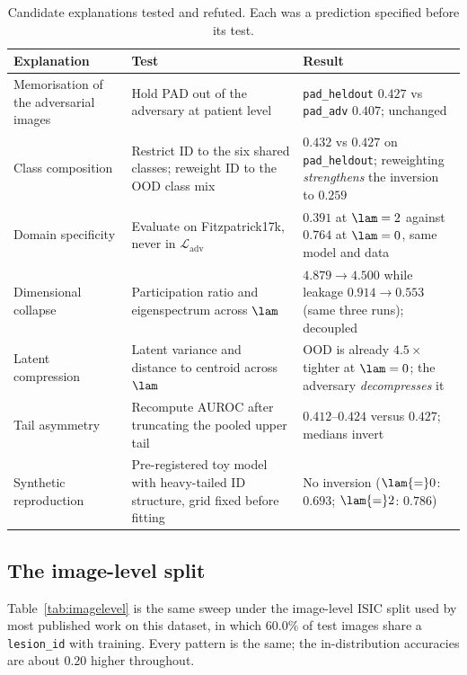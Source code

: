 \begin{table}[t]
\centering
\small
\caption{Candidate explanations tested and refuted. Each was a prediction specified
before its test.}
\label{tab:refuted}
\begin{tabular}{p{3.1cm}p{5.2cm}p{6.1cm}}
\toprule
Explanation & Test & Result \\
\midrule
Memorisation of the adversarial images & Hold PAD out of the adversary at patient level & \texttt{pad\_heldout} $0.427$ vs \texttt{pad\_adv} $0.407$; unchanged \\
Class composition & Restrict ID to the six shared classes; reweight ID to the OOD class mix & $0.432$ vs $0.427$ on \texttt{pad\_heldout}; reweighting \emph{strengthens} the inversion to $0.259$ \\
Domain specificity & Evaluate on Fitzpatrick17k, never in $\mathcal{L}_{\mathrm{adv}}$ & $0.391$ at $\lam = 2$ against $0.764$ at $\lam = 0$, same model and data \\
Dimensional collapse & Participation ratio and eigenspectrum across $\lam$ & $4.879 \to 4.500$ while leakage $0.914 \to 0.553$ (same three runs); decoupled \\
Latent compression & Latent variance and distance to centroid across $\lam$ & OOD is already $4.5\times$ tighter at $\lam = 0$; the adversary \emph{decompresses} it \\
Tail asymmetry & Recompute AUROC after truncating the pooled upper tail & $0.412$--$0.424$ versus $0.427$; medians invert \\
\midrule
Synthetic reproduction & Pre-registered toy model with heavy-tailed ID structure, grid fixed before fitting & No inversion ($\lam{=}0$: $0.693$; $\lam{=}2$: $0.786$) \\
\bottomrule
\end{tabular}
\end{table}

\subsection{The image-level split}
\label{app:imagelevel}

Table~\ref{tab:imagelevel} is the same sweep under the image-level ISIC split used
by most published work on this dataset, in which $60.0\%$ of test images share a
\texttt{lesion\_id} with training. Every pattern is the same; the in-distribution
accuracies are about $0.20$ higher throughout.

